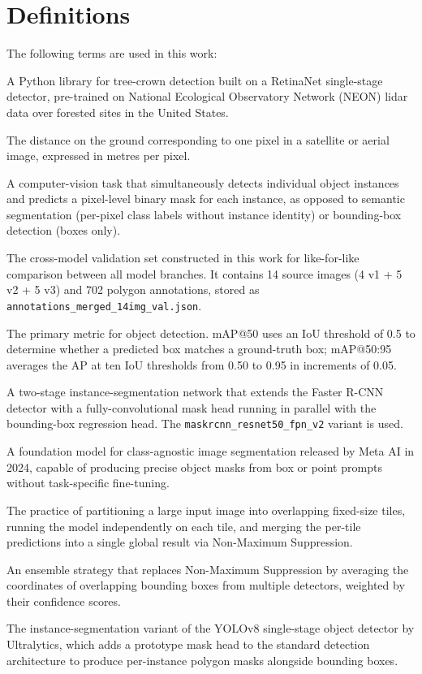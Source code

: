 \chapter*{Definitions}

The following terms are used in this work:

\begin{description}
\tightlist
\item[DeepForest]
A Python library for tree-crown detection built on a RetinaNet single-stage detector, pre-trained on National Ecological Observatory Network (NEON) lidar data over forested sites in the United States.
\item[Ground Sampling Distance (GSD)]
The distance on the ground corresponding to one pixel in a satellite or aerial image, expressed in metres per pixel.
\item[Instance segmentation]
A computer-vision task that simultaneously detects individual object instances and predicts a pixel-level binary mask for each instance, as opposed to semantic segmentation (per-pixel class labels without instance identity) or bounding-box detection (boxes only).
\item[M14 (14-image merged validation set)]
The cross-model validation set constructed in this work for like-for-like comparison between all model branches. It contains 14 source images (4 v1 + 5 v2 + 5 v3) and 702 polygon annotations, stored as \texttt{annotations\_merged\_14img\_val.json}.
\item[mAP (mean Average Precision)]
The primary metric for object detection. mAP@50 uses an IoU threshold of 0.5 to determine whether a predicted box matches a ground-truth box; mAP@50:95 averages the AP at ten IoU thresholds from 0.50 to 0.95 in increments of 0.05.
\item[Mask R-CNN]
A two-stage instance-segmentation network that extends the Faster R-CNN detector with a fully-convolutional mask head running in parallel with the bounding-box regression head. The \texttt{maskrcnn\_resnet50\_fpn\_v2} variant is used.
\item[SAM 2 (Segment Anything Model 2)]
A foundation model for class-agnostic image segmentation released by Meta AI in 2024, capable of producing precise object masks from box or point prompts without task-specific fine-tuning.
\item[Tiled inference]
The practice of partitioning a large input image into overlapping fixed-size tiles, running the model independently on each tile, and merging the per-tile predictions into a single global result via Non-Maximum Suppression.
\item[WBF (Weighted Box Fusion)]
An ensemble strategy that replaces Non-Maximum Suppression by averaging the coordinates of overlapping bounding boxes from multiple detectors, weighted by their confidence scores.
\item[YOLOv8-seg]
The instance-segmentation variant of the YOLOv8 single-stage object detector by Ultralytics, which adds a prototype mask head to the standard detection architecture to produce per-instance polygon masks alongside bounding boxes.
\end{description}

\newpage
